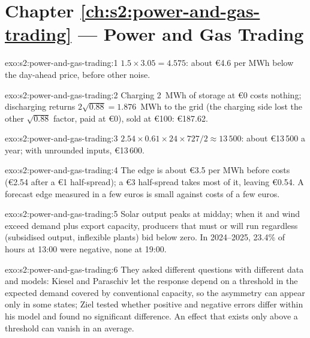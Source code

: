 \section*{Chapter \ref{ch:s2:power-and-gas-trading} --- Power and Gas Trading}

\begin{solution}{exo:s2:power-and-gas-trading:1}
$1.5 \times 3.05 = 4.575$: about \euro4.6 per MWh below the day-ahead price, before other noise.
\end{solution}

\begin{solution}{exo:s2:power-and-gas-trading:2}
Charging 2~MWh of storage at \euro0 costs nothing; discharging returns $2\sqrt{0.88} = 1.876$~MWh to the grid (the charging side lost the other
$\sqrt{0.88}$ factor, paid at \euro0), sold at \euro100: \euro187.62.
\end{solution}

\begin{solution}{exo:s2:power-and-gas-trading:3}
$2.54 \times 0.61 \times 24 \times 727 / 2 \approx 13\,500$: about \euro13\,500 a year; with unrounded inputs, \euro13\,600.
\end{solution}

\begin{solution}{exo:s2:power-and-gas-trading:4}
The edge is about \euro3.5 per MWh before costs (\euro2.54 after a \euro1 half-spread); a \euro3 half-spread takes most of it, leaving \euro0.54.
A forecast edge measured in a few euros is small against costs of a few euros.
\end{solution}

\begin{solution}{exo:s2:power-and-gas-trading:5}
Solar output peaks at midday; when it and wind exceed demand plus export capacity, producers that must or will run regardless (subsidised output,
inflexible plants) bid below zero. In 2024--2025, 23.4\% of hours at 13:00 were negative, none at 19:00.
\end{solution}

\begin{solution}{exo:s2:power-and-gas-trading:6}
They asked different questions with different data and models: Kiesel and Paraschiv let the response depend on a threshold in the expected demand
covered by conventional capacity, so the asymmetry can appear only in some states; Ziel tested whether positive and negative errors differ within his
model and found no significant difference. An effect that exists only above a threshold can vanish in an average.
\end{solution}

